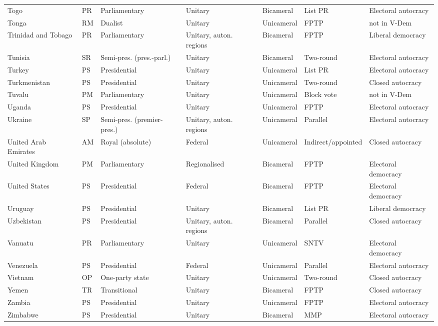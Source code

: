 \documentclass[11pt,a4paper]{article}
\begin{document}
{\begin{longtable}{p{2.9cm}lp{2.9cm}p{2.4cm}lp{1.9cm}p{2.0cm}}
Togo & PR & Parliamentary & Unitary & Bicameral & List PR & Electoral autocracy\\
Tonga & RM & Dualist & Unitary & Unicameral & FPTP & not in V-Dem\\
Trinidad and Tobago & PR & Parliamentary & Unitary, auton. regions & Bicameral & FPTP & Liberal democracy\\
Tunisia & SR & Semi-pres. (pres.-parl.) & Unitary & Bicameral & Two-round & Electoral autocracy\\
Turkey & PS & Presidential & Unitary & Unicameral & List PR & Electoral autocracy\\
Turkmenistan & PS & Presidential & Unitary & Unicameral & Two-round & Closed autocracy\\
Tuvalu & PM & Parliamentary & Unitary & Unicameral & Block vote & not in V-Dem\\
Uganda & PS & Presidential & Unitary & Unicameral & FPTP & Electoral autocracy\\
Ukraine & SP & Semi-pres. (premier-pres.) & Unitary, auton. regions & Unicameral & Parallel & Electoral autocracy\\
United Arab Emirates & AM & Royal (absolute) & Federal & Unicameral & Indirect/appointed & Closed autocracy\\
United Kingdom & PM & Parliamentary & Regionalised & Bicameral & FPTP & Electoral democracy\\
United States & PS & Presidential & Federal & Bicameral & FPTP & Electoral democracy\\
Uruguay & PS & Presidential & Unitary & Bicameral & List PR & Liberal democracy\\
Uzbekistan & PS & Presidential & Unitary, auton. regions & Bicameral & Parallel & Closed autocracy\\
Vanuatu & PR & Parliamentary & Unitary & Unicameral & SNTV & Electoral democracy\\
Venezuela & PS & Presidential & Federal & Unicameral & Parallel & Electoral autocracy\\
Vietnam & OP & One-party state & Unitary & Unicameral & Two-round & Closed autocracy\\
Yemen & TR & Transitional & Unitary & Bicameral & FPTP & Closed autocracy\\
Zambia & PS & Presidential & Unitary & Unicameral & FPTP & Electoral autocracy\\
Zimbabwe & PS & Presidential & Unitary & Bicameral & MMP & Electoral autocracy\\
\bottomrule\end{longtable}}
\end{document}
